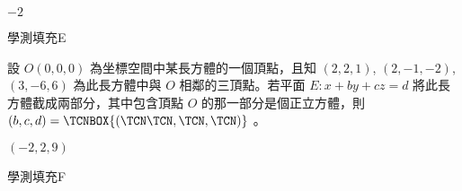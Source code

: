 \begin{QUESTIONS}
\begin{QUESTION}
\begin{QFROMS}
        \end{QFROMS}
        \begin{QTAGS}\end{QTAGS}
        \begin{QANS}
            $-2$
        \end{QANS}
        \begin{QSOLLIST}
        \end{QSOLLIST}
        \begin{QEMPTYSPACE}
        \end{QEMPTYSPACE}
    \end{QUESTION}
    \begin{QUESTION}
        \begin{ExamInfo}{97}{學測}{填充}{E}
        \end{ExamInfo}
        \begin{ExamAnsRateInfo}{13}{37}{2}{0}
        \end{ExamAnsRateInfo}
        \begin{QBODY}
            設 $O(0, 0, 0)$ 為坐標空間中某長方體的一個頂點，且知 $(2, 2,1)$, $(2, -1, -2)$, $(3, -6, 6)$ 為此長方體中與 $O$ 相鄰的三頂點。若平面 $E : x + by + cz = d$ 將此長方體截成兩部分，其中包含頂點 $O$ 的那一部分是個正立方體，則 $(b,c,d)= 
\TCNBOX{(\TCN\TCN,\TCN,\TCN)}$ 。
        \end{QBODY}
        \begin{QFROMS}
        \end{QFROMS}
        \begin{QTAGS}\end{QTAGS}
        \begin{QANS}
            $(-2,2,9)$
        \end{QANS}
        \begin{QSOLLIST}
        \end{QSOLLIST}
        \begin{QEMPTYSPACE}
        \end{QEMPTYSPACE}
    \end{QUESTION}
    \begin{QUESTION}
        \begin{ExamInfo}{97}{學測}{填充}{F}
        \end{ExamInfo}
        \begin{ExamAnsRateInfo}{20}{34}{19}{7}
        \end{ExamAnsRateInfo}
        \begin{QBODY}

\end{QBODY}
\end{QUESTION}
\end{QUESTIONS}
